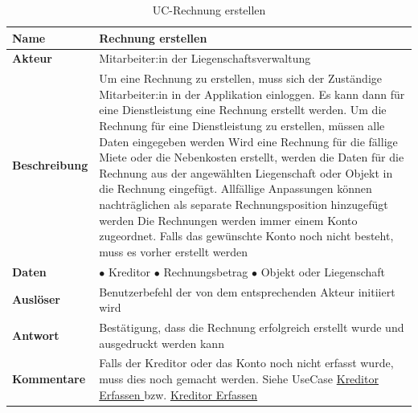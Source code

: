 \vspace*{-1.2cm}

\begin{table}[H]
  \centering
  \settowidth{}
  \setlength\extrarowheight{2pt}
  \begin{tabulary}{1.0\textwidth}{|a|m{14cm}|}
    \hline
    \textbf{Name}& Rechnung erstellen\\
    \hline
    \textbf{Akteur}& Mitarbeiter:in der Liegenschaftsverwaltung\\
    \hline 
    \textbf{Beschreibung} & Um eine Rechnung zu erstellen, muss sich der Zuständige Mitarbeiter:in in der Applikation einloggen. Es kann dann für eine Dienstleistung eine Rechnung erstellt werden. Um die Rechnung für eine Dienstleistung zu erstellen, müssen alle Daten eingegeben werden \newline 
    Wird eine Rechnung für die fällige Miete oder die Nebenkosten erstellt, werden die Daten für die Rechnung aus der angewählten Liegenschaft oder Objekt in die Rechnung eingefügt. Allfällige Anpassungen können nachträglichen als separate Rechnungsposition hinzugefügt werden \newline
    Die Rechnungen werden immer einem Konto zugeordnet. Falls das gewünschte Konto noch nicht besteht, muss es vorher erstellt werden\\
    \hline
    \textbf{Daten} &       
      $\bullet$ Kreditor\newline
      $\bullet$ Rechnungsbetrag \newline
      $\bullet$ Objekt oder Liegenschaft\\
    \hline
    \textbf{Auslöser} & Benutzerbefehl der von dem entsprechenden Akteur initiiert wird\\
    \hline
    \textbf{Antwort} & Bestätigung, dass die Rechnung erfolgreich erstellt wurde und ausgedruckt werden kann\\
    \hline
    \textbf{Kommentare} & Falls der Kreditor oder das Konto noch nicht erfasst wurde, muss dies noch gemacht werden. Siehe UseCase \hyperref[kreditorErfassen]{Kreditor Erfassen } bzw. \hyperref[kreditorErfassen]{Kreditor Erfassen }\\
    \hline
  \end{tabulary}
  \caption{UC-Rechnung erstellen}
\end{table}

